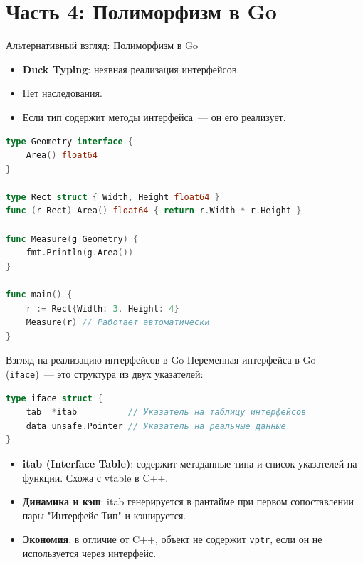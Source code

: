 \documentclass[10pt, aspectratio=169]{beamer}
\begin{document}
\section{Часть 4: Полиморфизм в Go}

\begin{frame}[fragile]{Альтернативный взгляд: Полиморфизм в Go}
    \begin{itemize}
        \item \textbf{Duck Typing}: неявная реализация интерфейсов.
        \item Нет наследования.
        \item Если тип содержит методы интерфейса~--- он его реализует.
    \end{itemize}

\begin{lstlisting}[language=Go, basicstyle=\tiny, backgroundcolor=\color{gray!10}]
type Geometry interface {
    Area() float64
}

type Rect struct { Width, Height float64 }
func (r Rect) Area() float64 { return r.Width * r.Height }

func Measure(g Geometry) {
    fmt.Println(g.Area())
}

func main() {
    r := Rect{Width: 3, Height: 4}
    Measure(r) // Работает автоматически
}
\end{lstlisting}
\end{frame}

\begin{frame}[fragile]{Взгляд на реализацию интерфейсов в Go}
    Переменная интерфейса в Go (\texttt{iface})~--- это структура из двух указателей:
    
\begin{lstlisting}[language=Go, basicstyle=\small, backgroundcolor=\color{gray!10}]
type iface struct {
    tab  *itab          // Указатель на таблицу интерфейсов
    data unsafe.Pointer // Указатель на реальные данные
}
\end{lstlisting}

    \begin{itemize}
        \item \textbf{itab (Interface Table)}: содержит метаданные типа и список указателей на функции. Схожа с vtable в C++.
        \item \textbf{Динамика и кэш}: itab генерируется в рантайме при первом сопоставлении пары "Интерфейс-Тип" и кэшируется.
        \item \textbf{Экономия}: в отличие от C++, объект не содержит \texttt{vptr}, если он не используется через интерфейс.
    \end{itemize}
\end{frame}
\end{document}
